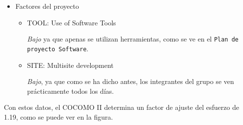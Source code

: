 \documentclass[spanish,a4paper,11pt, twoside]{report}	%
\begin{document}
\begin {itemize}
\begin{itemize}
			Al tratarse de estudiantes todavía no se tiene una gran sapiencia sobre progamación, por lo que consideramos esta campo como \textit{bajo}.
			\item{AEXP: Application Experience}

			\textit{Nominal}.
			\item{PEXP: Platform Experience}

			\textit{Nominal}.
			\item{LTEXT: Language and Tool Experience}

			\textit{Alta} porque trabajamos con Java en un entorno al que estamos acostumbrados: Eclipse. La otra herramienta que utilizamos la mayor parte del tiempo es el TeXworks para escribir en \LaTeX, que también la dominamos bastante.
			\item{PCON: Personnel Continuity}

			\textit{Alta} salvo abandono.
		\end{itemize}
	\item{Factores del proyecto}
		\begin{itemize}
			\item{TOOL: Use of Software Tools}

			\textit{Bajo} ya que apenas se utilizan herramientas, como se ve en el \texttt{Plan de proyecto Software}.
			\item{SITE: Multisite development}

			\textit{Bajo}, ya que como se ha dicho antes, los integrantes del grupo se ven prácticamente todos los días.
		\end{itemize}
\end{itemize}

Con estos datos, el COCOMO II determina un factor de ajuste del esfuerzo de 1.19, como se puede ver en la figura.
\end{document}
